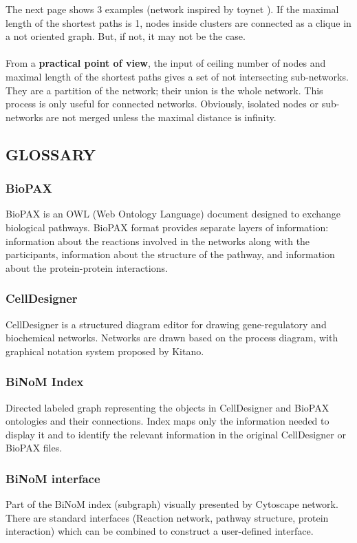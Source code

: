 The next page shows 3 examples (network inspired by toynet ). If the maximal length of the shortest paths is 1, nodes inside clusters are connected as a clique in a not oriented graph. But, if not, it may not be the case.\\\\
From a \textbf{practical point of view}, the input of ceiling number of nodes and maximal length of the shortest paths gives a set of not intersecting sub-networks. They are a partition of the network; their union is the whole network. This process is only useful for connected networks. Obviously, isolated nodes or sub-networks are not merged unless the maximal distance is infinity.

\subsection{GLOSSARY}\label{GLOSSARY}
\subsubsection{BioPAX}
BioPAX is an OWL (Web Ontology Language) document designed to exchange biological pathways. BioPAX format provides separate layers of information: information about the reactions involved in the networks along with the participants, information about the structure of the pathway, and information about the protein-protein interactions. 
\subsubsection{CellDesigner}
CellDesigner is a structured diagram editor for drawing gene-regulatory and biochemical networks. Networks are drawn based on the process diagram, with graphical notation system proposed by Kitano.
\subsubsection{BiNoM Index}
Directed labeled graph representing the objects in CellDesigner and BioPAX ontologies and their connections. Index maps only the information needed to display it and to identify the relevant information in the original CellDesigner or BioPAX files.
\subsubsection{BiNoM interface}
Part of the BiNoM index (subgraph) visually presented by Cytoscape network. There are standard interfaces (Reaction network, pathway structure, protein interaction) which can be combined to construct a user-defined interface.
